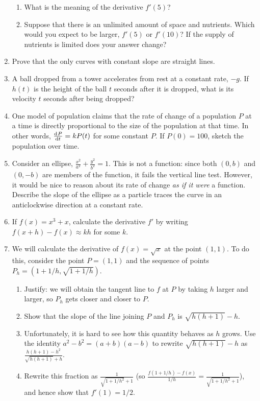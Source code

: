 \begin{enumerate}
\begin{enumerate}
      \item What is the meaning of the derivative $ f'(5) $?
      \item Suppose that there is an unlimited amount of space and nutrients. Which would you
            expect to be larger, $ f'(5) $ or $ f'(10) $? If the supply of nutrients is limited
            does your answer change?
    \end{enumerate}
  \item Prove that the only curves with constant slope are straight lines.
  \item A ball dropped from a tower accelerates from rest at a constant rate, $ -g $. If $ h(t) $ is the height of the ball $ t $ seconds
        after it is dropped, what is its velocity $ t $ seconds after being dropped?
  \item One model of population claims that the rate of change of a population $ P $ at a time is directly proportional to the size of
        the population at that time. In other words, $ \od{P}{t} = kP(t) $ for some constant $ P $. If $ P(0) = 100 $, sketch
        the population over time.
  \item Consider an ellipse, $ \frac{x^2}{a^2} + \frac{y^2}{b^2} = 1 $. This is not a function: since both $ (0, b) $ and $ (0, -b) $ are
            members of the function, it fails the vertical line test. However, it would be nice to reason about its
            rate of change \textit{as if it were} a function. Describe the slope of the ellipse as a particle traces the curve in
            an anticlockwise direction at a constant rate.
  \item If $ f(x) = x^3 + x $, calculate the derivative $ f' $ by writing $ f(x + h) - f(x) \approx kh $ for some $ k $.
  \item We will calculate the derivative of $ f(x) = \sqrt{x} $ at the point $ (1,1) $. To do this,
        consider the point $ P = (1,1) $ and the sequence of points $ P_h = (1 + 1/h, \sqrt{1 + 1/h}) $.
    \begin{enumerate}
      \item Justify: we will obtain the tangent line to $ f $ at $ P $ by taking $ h $ larger and larger, so $ P_h $
            gets closer and closer to $ P $.
      \item Show that the slope of the line joining $ P $ and $ P_h $ is $ \sqrt{h(h + 1)} - h $.
      \item Unfortunately, it is hard to see how this quantity behaves as $ h $ grows. Use the identity
            $ a^2 - b^2 = (a + b)(a - b) $ to rewrite $ \sqrt{h(h + 1)} - h $ as $ \frac{h(h + 1) - h^2}{\sqrt{h(h + 1)} + h} $.
      \item Rewrite this fraction as $ \frac{1}{\sqrt{1 + 1/h^2} + 1} $ (so $ \frac{f(1 + 1/h) - f(x)}{1/h} = \frac{1}{\sqrt{1 + 1/h^2} + 1} $),
            and hence show that $ f'(1) = 1/2 $.
    \end{enumerate}
\end{enumerate}

